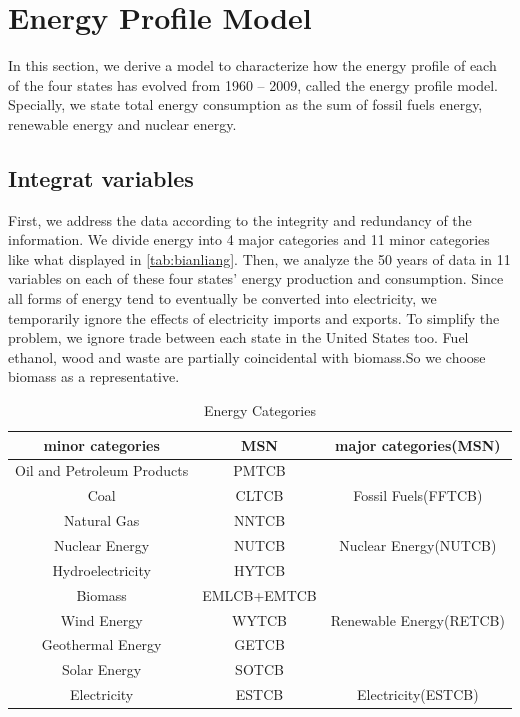 \section{Energy Profile Model}
In this section, we derive a model to characterize how the energy profile of each of the four states has evolved from 1960 – 2009, called the energy profile model. Specially, we state total energy consumption as the sum of fossil fuels energy, renewable energy and nuclear energy.
\subsection{Integrat variables}
First, we address the data according to the integrity and redundancy of the information. We divide energy into 4 major categories and 11 minor categories like what displayed in \autoref{tab:bianliang}. 
Then, we analyze the 50 years of data in 11 variables on each of these four states’ energy production and consumption. 
Since all forms of energy tend to eventually be converted into electricity, we temporarily ignore the effects of electricity imports and exports. To simplify the problem, we ignore trade between each state in the United States too. Fuel ethanol, wood and waste are partially coincidental with biomass.So we choose biomass as a representative. \\
\begin{table}[h]
	\begin{tabular}{ccc}%
		\toprule
		minor categories  & MSN & major categories(MSN) \\
		\midrule
		Oil and Petroleum Products & PMTCB& \\
		Coal & CLTCB & Fossil Fuels(FFTCB)\\
		Natural Gas & NNTCB & \\
		\midrule	
		Nuclear Energy &NUTCB& Nuclear Energy(NUTCB) \\
		\midrule
		Hydroelectricity & HYTCB &  \\
		Biomass &EMLCB+EMTCB &  \\
		Wind Energy& WYTCB & Renewable Energy(RETCB) \\
		Geothermal Energy 	&GETCB  &  \\
		Solar Energy 	& SOTCB&  \\
		\midrule
		Electricity &ESTCB&Electricity(ESTCB)\\
		\bottomrule                  
	\end{tabular}
	\caption{Energy Categories}                      %
	\label{tab:bianliang} 
\end{table}
